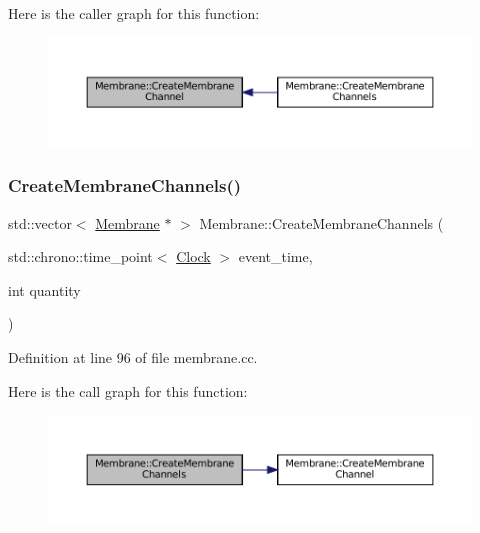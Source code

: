 Here is the caller graph for this function\+:\nopagebreak
\begin{figure}[H]
\begin{center}
\leavevmode
\includegraphics[width=350pt]{class_membrane_a589b56529ac634a52b2a5fc78d356973_icgraph}
\end{center}
\end{figure}
\mbox{\label{class_membrane_a72987fae41e552af5befcd9a62aa6e46}} 
\subsubsection{\texorpdfstring{Create\+Membrane\+Channels()}{CreateMembraneChannels()}}
{\footnotesize\ttfamily std\+::vector$<$ \mbox{\hyperlink{class_membrane}{Membrane}} $\ast$ $>$ Membrane\+::\+Create\+Membrane\+Channels (\begin{DoxyParamCaption}\item[{std\+::chrono\+::time\+\_\+point$<$ \mbox{\hyperlink{universe_8h_a0ef8d951d1ca5ab3cfaf7ab4c7a6fd80}{Clock}} $>$}]{event\+\_\+time,  }\item[{int}]{quantity }\end{DoxyParamCaption})}



Definition at line 96 of file membrane.\+cc.

Here is the call graph for this function\+:\nopagebreak
\begin{figure}[H]
\begin{center}
\leavevmode
\includegraphics[width=350pt]{class_membrane_a72987fae41e552af5befcd9a62aa6e46_cgraph}
\end{center}
\end{figure}
\mbox{\label{class_membrane_a12413d933a62b3bbb7931c6ab25de7de}} 
